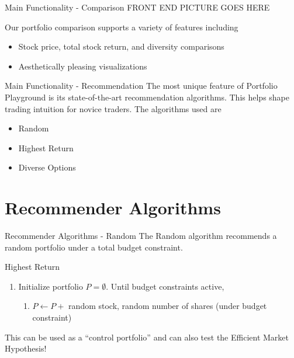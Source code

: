 \documentclass{beamer}
\begin{document}
\begin{frame}{Main Functionality - Comparison}
FRONT END PICTURE GOES HERE

Our portfolio comparison supports a variety of features including
	\begin{itemize}
		\item Stock price, total stock return, and diversity comparisons
		\item Aesthetically pleasing visualizations
	\end{itemize}

\end{frame}

\begin{frame}{Main Functionality - Recommendation}
The most unique feature of Portfolio Playground is its state-of-the-art recommendation algorithms. This helps shape trading intuition for novice traders. The algorithms used are

\begin{itemize}
\item Random
\item Highest Return
\item Diverse Options
\end{itemize}

\end{frame}

\section{Recommender Algorithms}
\begin{frame}{Recommender Algorithms - Random}
The Random algorithm recommends a random portfolio under a total budget constraint.

\begin{block}{Highest Return}
\begin{enumerate}
	\item Initialize portfolio $P = \emptyset$. Until budget constraints active,
		\begin{enumerate}
			\item $P \leftarrow P +$ random stock, random number of shares (under budget constraint)
		\end{enumerate}
\end{enumerate}
\end{block}

\pause
This can be used as a ``control portfolio'' and can also test the Efficient Market Hypothesis!
\end{frame}
\end{document}
